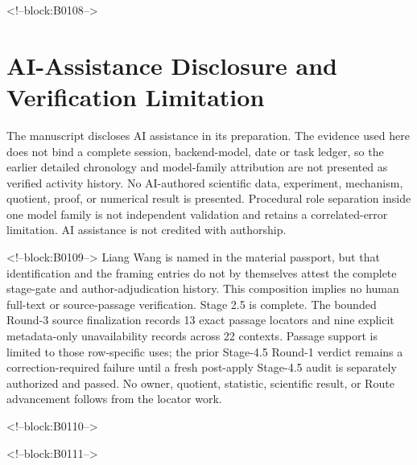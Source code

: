 \documentclass[11pt,a4paper]{article}
\begin{document}
<!--block:B0108-->
\section*{AI-Assistance Disclosure and Verification Limitation}
The manuscript discloses AI assistance in its preparation. The evidence used here
does not bind a complete session, backend-model, date or task ledger, so the earlier
detailed chronology and model-family attribution are not presented as verified
activity history. No AI-authored scientific data, experiment, mechanism, quotient, proof, or
numerical result is presented. Procedural role separation inside one model family is
not independent validation and retains a correlated-error limitation. AI assistance
is not credited with authorship.

<!--block:B0109-->
Liang Wang is named in the material passport, but that identification and the
framing entries do not by themselves attest the complete stage-gate and
author-adjudication history. This composition implies no human full-text or
source-passage verification. Stage 2.5 is
complete. The bounded Round-3 source finalization records 13 exact passage locators
and nine explicit metadata-only unavailability records across 22 contexts. Passage
support is limited to those row-specific uses; the prior Stage-4.5 Round-1 verdict
remains a correction-required failure until a fresh post-apply Stage-4.5 audit is
separately authorized and passed. No owner, quotient, statistic, scientific result,
or Route advancement follows from the locator work.

<!--block:B0110-->



<!--block:B0111-->
\end{document}
